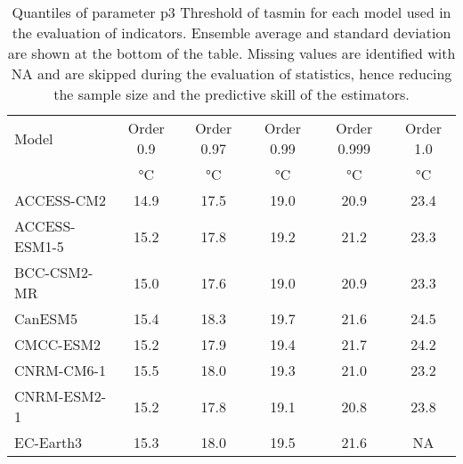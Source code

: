 \begin{table}
  \centering
  \caption{Quantiles of parameter $\mathrm{p3}$ {Threshold of \gls{tasmin}} for each model used in the evaluation of indicators. Ensemble average and standard deviation are shown at the bottom of the table. Missing values are identified with NA and are skipped during the evaluation of statistics, hence reducing the sample size and the predictive skill of the estimators.}
  \label{tab:parameters_heat_wave_index_thresh}
  \begin{tabular}{lccccc}
    Model              & Order 0.9                    & Order 0.97                   & Order 0.99                   & Order 0.999                  & Order 1.0                    \\
                       & \unit{\degreeCelsius}        & \unit{\degreeCelsius}        & \unit{\degreeCelsius}        & \unit{\degreeCelsius}        & \unit{\degreeCelsius}        \\
    \hline
    ACCESS-CM2         & 14.9                         & 17.5                         & 19.0                         & 20.9                         & 23.4                         \\
    ACCESS-ESM1-5      & 15.2                         & 17.8                         & 19.2                         & 21.2                         & 23.3                         \\
    BCC-CSM2-MR        & 15.0                         & 17.6                         & 19.0                         & 20.9                         & 23.3                         \\
    CanESM5            & 15.4                         & 18.3                         & 19.7                         & 21.6                         & 24.5                         \\
    CMCC-ESM2          & 15.2                         & 17.9                         & 19.4                         & 21.7                         & 24.2                         \\
    CNRM-CM6-1         & 15.5                         & 18.0                         & 19.3                         & 21.0                         & 23.2                         \\
    CNRM-ESM2-1        & 15.2                         & 17.8                         & 19.1                         & 20.8                         & 23.8                         \\
    EC-Earth3          & 15.3                         & 18.0                         & 19.5                         & 21.6                         & NA                           \\

\end{tabular}
\end{table}
